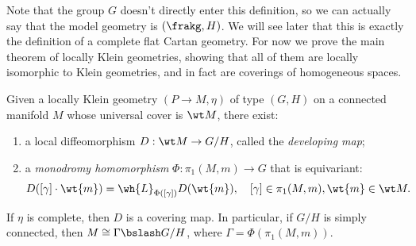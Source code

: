 Note that the group $G$ doesn't directly enter this definition, so we can actually say that the model geometry is $(\frakg,H)$. We will see later that this is exactly the definition of a complete flat Cartan geometry. For now we prove the main theorem of locally Klein geometries, showing that all of them are locally isomorphic to Klein geometries, and in fact are coverings of homogeneous spaces.


\begin{prop}\label{prop locally klein}
    Given a locally Klein geometry $(P\to M,\eta)$ of type $(G,H)$ on a connected manifold $M$ whose universal cover is $\wt M$, there exist:
    \begin{enumerate}
        \item a local diffeomorphism $D: \wt M\to G\slash H$, called the \emph{developing map};
        \item a \emph{monodromy homomorphism} $\Phi:\pi_1(M,m)\to G$ that is equivariant: 
        \[D([\gamma]\cdot \wt{m})=\wh{L}_{\Phi([\gamma])}D(\wt{m}),\quad [\gamma]\in \pi_1(M,m),\wt{m}\in\wt M.\]
    \end{enumerate} 
    If $\eta$ is complete, then $D$ is a covering map. In particular, if $G\slash H$ is simply connected, then $M\cong \Gamma\bslash G\slash H$, where $\Gamma=\Phi(\pi_1(M,m))$.
\end{prop}
